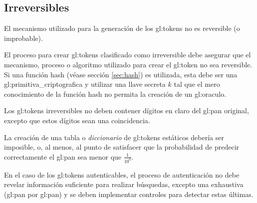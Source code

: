 %
%

\subsection{Irreversibles}

{
  El mecanismo utilizado para la generación de los \glspl{gl:token}
  no es reversible (o improbable).
}

{
  El proceso para crear \glspl{gl:token} clasificado como irreversible
  debe asegurar que el mecanismo, proceso o algoritmo utilizado para
  crear el \gls{gl:token} no sea reversible. Si una función hash (véase
  sección \ref{sec:hash}) es utilizada, esta debe ser una
  \gls{gl:primitiva_criptografica} y utilizar una llave secreta $k$ tal que
  el mero conocimiento de la función hash no permita la creación de un
  \gls{gl:oraculo}.
}

{
  Los \glspl{gl:token} irreversibles no deben contener dígitos en claro del
  \gls{gl:pan} original, excepto que estos dígitos sean una coincidencia.
}

{
  La creación de una tabla o \textit{diccionario} de \glspl{gl:token}
  estáticos debería ser imposible, o, al menos, al punto de satisfacer que
  la probabilidad de predecir correctamente el \gls{gl:pan} sea menor que
  $\frac{1}{10^6}$.
}

{
  En el caso de los \glspl{gl:token} autenticables, el proceso de
  autenticación no debe revelar información suficiente para realizar
  búsquedas, excepto una exhaustiva (\gls{gl:pan} por \gls{gl:pan}) y se
  deben implementar controles para detectar estas últimas.
}

